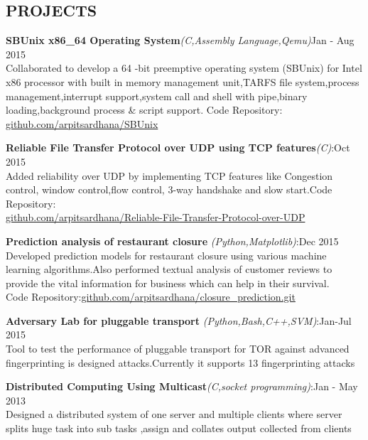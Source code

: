 \documentclass[margin]{res}
\begin{document}
\begin{resume}
\section{PROJECTS}
\par
\textbf{SBUnix {x86\_64} Operating System}\textit{(C,Assembly Language,Qemu)}\hfill Jan - Aug 2015\\ 
Collaborated to develop a 64 -bit preemptive operating system (SBUnix) for Intel x86 processor with built in memory management unit,TARFS file system,process management,interrupt support,system call and shell with pipe,binary loading,background process \& script support.
Code Repository: \url{github.com/arpitsardhana/SBUnix}
\par
\textbf{Reliable File Transfer Protocol over UDP using TCP features}\textit{(C)}:\hfill Oct 2015\\
Added reliability over UDP by implementing TCP features like Congestion control, window control,flow control, 3-way handshake and slow start.Code Repository:\\
\url{github.com/arpitsardhana/Reliable-File-Transfer-Protocol-over-UDP}
\par
\textbf{Prediction analysis of restaurant closure }\textit{(Python,Matplotlib)}:\hfill Dec 2015\\
 Developed prediction models for restaurant closure using various machine learning algorithms.Also performed textual analysis of customer reviews to provide the vital information for business which can help in their survival.\\
 Code Repository:\url{github.com/arpitsardhana/closure_prediction.git}
\par

\textbf{Adversary Lab for pluggable transport }\textit{(Python,Bash,C++,SVM)}:\hfill Jan-Jul 2015\\
Tool to test the performance of pluggable transport for TOR against advanced fingerprinting is designed attacks.Currently it supports 13 fingerprinting attacks
\par
\textbf{Distributed Computing Using Multicast}\textit{(C,socket programming)}:\hfill Jan - May 2013\\
 Designed a distributed system of one server and multiple clients where server splits huge task into sub tasks ,assign and collates output collected from clients
 
 
 
 



\end{resume}
\end{document}
